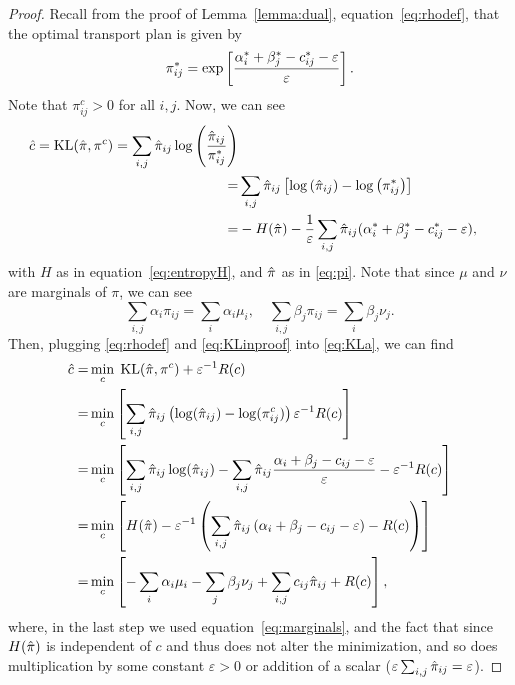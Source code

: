 \begin{proof}
	Recall from the proof of Lemma~\ref{lemma:dual}, equation~\eqref{eq:rhodef}, that the optimal transport plan is given by
	\[ \pi_{ij}^* = \exp\left[\frac{\alpha_i^* + \beta_j^* - c_{ij}^* - \varepsilon}{\varepsilon}\right] . \]
	Note that $\pi^c_{ij} > 0$ for all $i,j$. Now, we can see 
	\begin{align}
		\hat{c} = \text{KL}(\hat{\pi}, \pi^c) =  \sum_{i,j} \hat{\pi}_{ij} \log\left(\frac{\hat{\pi}_{ij}}{\pi_{ij}^*}\right)\nonumber \\
		= & \sum_{i,j} \hat{\pi}_{ij} \left[\log\left(\hat{\pi}_{ij}\right) - \log\left(\pi_{ij}^*\right)\right] \nonumber\\
		= & -H(\hat{\pi}) - \frac{1}{\varepsilon} \sum_{i,j} \hat{\pi}_{ij} (\alpha_i^* + \beta_j^* - c_{ij}^*-\varepsilon),
		\label{eq:KLinproof}
	\end{align}
	with $H$ as in equation~\eqref{eq:entropyH}, and $\hat{\pi}$ as in \eqref{eq:pi}. Note that since $\mu$ and $\nu$ are marginals of $\pi$, we can see 
	\begin{equation}
		\sum_{i,j} \alpha_{i}\pi_{ij}= \sum_i \alpha_i \mu_i, \quad \sum_{i,j} \beta_{j}\pi_{ij}= \sum_i \beta_j \nu_j.
		\label{eq:marginals}
	\end{equation}
	Then, plugging \eqref{eq:rhodef} and \eqref{eq:KLinproof} into \eqref{eq:KLa}, we can find
	\begin{align}
		\hat{c} = &\min_c\; \text{KL}(\hat{\pi}, \pi^c) + \varepsilon^{-1} R(c)  \nonumber \\
		= & \min_c \left[\sum_{i,j} \hat{\pi}_{ij} \left(\log(\hat{\pi}_{ij}) - \log(\pi^c_{ij})\right) \varepsilon^{-1} R(c) \right] \nonumber \\
		= & \min_c \left[\sum_{i,j} \hat{\pi}_{ij}\log(\hat{\pi}_{ij}) - \sum_{i,j} \hat{\pi}_{ij} \frac{\alpha_i + \beta_j - c_{ij} - \varepsilon}{\varepsilon} - \varepsilon^{-1} R(c) \right] \nonumber \\
		= & \min_c \left[H(\hat{\pi}) - \varepsilon^{-1}\left(\sum_{i,j} \hat{\pi}_{ij} \left(\alpha_i + \beta_j - c_{ij} - \varepsilon\right) -  R(c) \right) \right] \nonumber \\
		= & \min_c \left[ - \sum_i \alpha_i \mu_i - \sum_j \beta_j \nu_j +  \sum_{i,j} c_{ij} \hat{\pi}_{ij} +  R(c) \right],
		\label{eq:minimization}
	\end{align}
	where, in the last step we used equation~\eqref{eq:marginals}, and the fact that since $H(\hat{\pi})$ is independent of $c$ and thus does not alter the minimization, and so does multiplication by some constant $\varepsilon > 0$ or addition of a scalar ($\varepsilon \sum_{i,j} \hat{\pi}_{ij}  = \varepsilon$). \par 

\end{proof}
